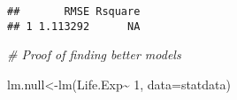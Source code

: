 \documentclass[
]{article}
\newenvironment{Shaded}{\begin{snugshade}}{\end{snugshade}}
\newcommand{\AttributeTok}[1]{\textcolor[rgb]{0.77,0.63,0.00}{#1}}
\newcommand{\CommentTok}[1]{\textcolor[rgb]{0.56,0.35,0.01}{\textit{#1}}}
\newcommand{\DecValTok}[1]{\textcolor[rgb]{0.00,0.00,0.81}{#1}}
\newcommand{\FunctionTok}[1]{\textcolor[rgb]{0.00,0.00,0.00}{#1}}
\newcommand{\NormalTok}[1]{#1}
\newcommand{\OtherTok}[1]{\textcolor[rgb]{0.56,0.35,0.01}{#1}}
\newcommand{\SpecialCharTok}[1]{\textcolor[rgb]{0.00,0.00,0.00}{#1}}
\begin{document}
\begin{Shaded}
\end{Shaded}

\begin{verbatim}
##       RMSE Rsquare
## 1 1.113292      NA
\end{verbatim}

\begin{Shaded}
\begin{Highlighting}[]
\CommentTok{\# Proof of finding better models}
 
\NormalTok{lm.null}\OtherTok{\textless{}{-}}\FunctionTok{lm}\NormalTok{(Life.Exp}\SpecialCharTok{\textasciitilde{}} \DecValTok{1}\NormalTok{, }\AttributeTok{data=}\NormalTok{statdata)}


\end{Highlighting}
\end{Shaded}
\end{document}
